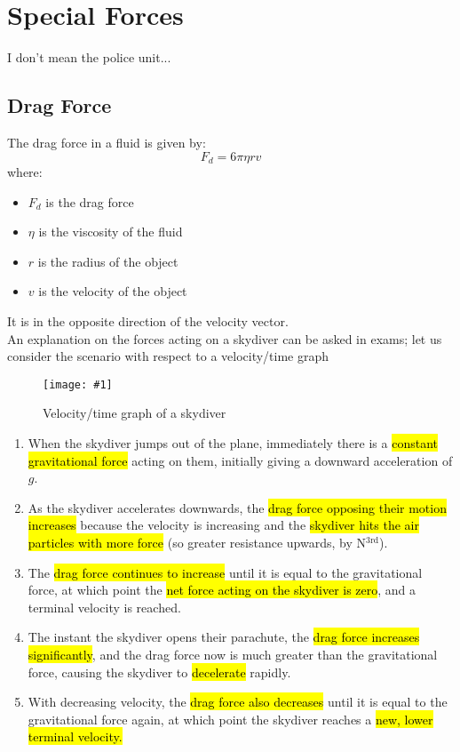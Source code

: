 \documentclass[a4paper,12pt]{article}
\let\oldsection\section
\renewcommand\section{\clearpage\oldsection}
\newcommand{\lb}{\\[8pt]}
\newcommand{\img}[4]{\begin{center}
  \begin{figure}[H]
    \centering
    \texttt{[image: \#1]}
    \caption{#3}
    \label{fig:#4}
  \end{figure}
\end{center}}
\begin{document}
\section{Special Forces}

I don't mean the police unit...

\subsection{Drag Force}

The drag force in a fluid is given by:
$$F_d = 6\pi \eta r v$$
where:
\begin{itemize}
  \item $F_d$ is the drag force
  \item $\eta$ is the viscosity of the fluid
  \item $r$ is the radius of the object
  \item $v$ is the velocity of the object
\end{itemize}

It is in the opposite direction of the velocity vector.\lb
An explanation on the forces acting on a skydiver can be asked in exams; let us consider the scenario with respect to a velocity/time graph
\img{material/terminalvgraph.png}{0.75}{Velocity/time graph of a skydiver}{skydiver}

\begin{enumerate}
  \item When the skydiver jumps out of the plane, immediately there is a \hl{constant gravitational force} acting on them, initially giving a downward acceleration of $g$.
  \item As the skydiver accelerates downwards, the \hl{drag force opposing their motion increases} because the velocity is increasing and the \hl{skydiver hits the air particles with more force} (so greater resistance upwards, by N$^{3\text{rd}}$).
  \item The \hl{drag force continues to increase} until it is equal to the gravitational force, at which point the \hl{net force acting on the skydiver is zero}, and a terminal velocity is reached.
  \item The instant the skydiver opens their parachute, the \hl{drag force increases significantly}, and the drag force now is much greater than the gravitational force, causing the skydiver to \hl{decelerate} rapidly.
  \item With decreasing velocity, the \hl{drag force also decreases} until it is equal to the gravitational force again, at which point the skydiver reaches a \hl{new, lower terminal velocity.}
\end{enumerate}
\end{document}
